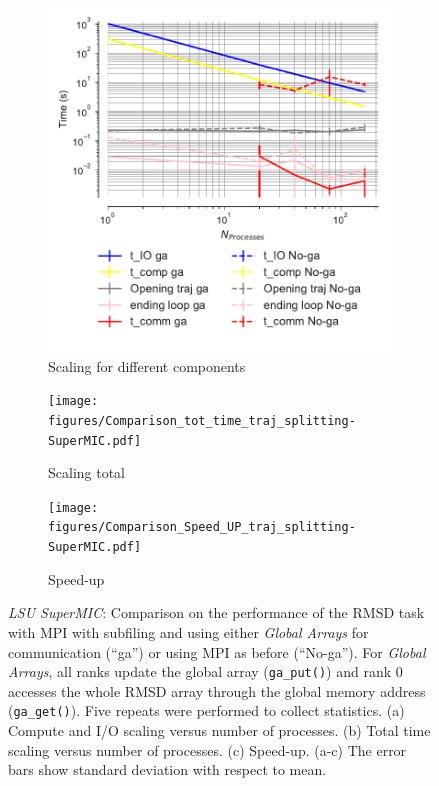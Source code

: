 \begin{figure}[!htb]
  \centering
  \begin{subfigure}{.3\textwidth}
    \includegraphics[width=\linewidth]{figures/Comparison_IO_compute_scaling_traj_splitting-SuperMIC.pdf}
    \captionsetup{format=hang}
    \caption{Scaling for different components}
    \label{fig:MPIscaling-SuperMIC}
  \end{subfigure}
  \hfill
  \begin{subfigure}{.3\textwidth}
    \texttt{[image: figures/Comparison\_tot\_time\_traj\_splitting-SuperMIC.pdf]}
    \caption{Scaling total}
    \label{fig:MPItottime-SuperMIC}
  \end{subfigure}
  \hfill
  \begin{subfigure}{.3\textwidth}
    \texttt{[image: figures/Comparison\_Speed\_UP\_traj\_splitting-SuperMIC.pdf]}
    \caption{Speed-up}
    \label{fig:MPIspeedup-SuperMIC}
  \end{subfigure}

  \caption{\emph{LSU SuperMIC}: Comparison on the performance of the RMSD task with MPI with subfiling and using either \emph{Global Arrays} for communication (``ga'') or using MPI as before (``No-ga'').
    For \emph{Global Arrays}, all ranks update the global array (\texttt{ga\_put()}) and rank 0 accesses the whole RMSD array through the global memory address (\texttt{ga\_get()}).
    Five repeats were performed to collect statistics.
    (a) Compute and I/O scaling versus number of processes.
    (b) Total time scaling versus number of processes.
    (c) Speed-up.
    (a-c) The error bars show standard deviation with respect to mean.}
  \label{fig:MPIwithIO-split-SuperMIC}
\end{figure}

